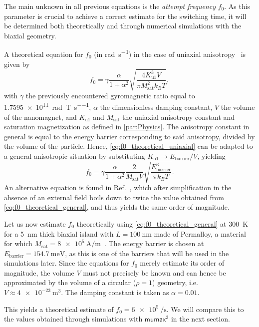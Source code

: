 \documentclass[11pt,a4paper,english,twoside]{article}
\newcommand{\mumax}{$\mathsf{mumax}^3$}
\begin{document}
The main unknown in all previous equations is the \textit{attempt frequency} $f_0$. As this parameter is crucial to achieve a correct estimate for the switching time, it will be determined both theoretically and through numerical simulations with the biaxial geometry. \par
A theoretical equation for $f_0$ (in \si{\radian\per\second}) in the case of uniaxial anisotropy~\cite{MuMax3, LEL-17b, f0_mumax3_reference} is given by
\begin{equation}
    f_0 = \gamma \frac{\alpha}{1+\alpha^2} \sqrt{\frac{4 K_\mathrm{u1}^3 V}{\pi M_\mathrm{sat}^2 k_B T}} \mathrm{,}
    \label{eq:f0_theoretical_uniaxial}
\end{equation}
with $\gamma$ the previously encountered gyromagnetic ratio equal to \SI{1.7595e11}{\radian\per\tesla\per\second}, $\alpha$ the dimensionless damping constant, $V$ the volume of the nanomagnet, and $K_\mathrm{u1}$ and $M_\mathrm{sat}$ the uniaxial anisotropy constant and saturation magnetization as defined in \cref{par:Physics}. The anisotropy constant in general is equal to the energy barrier corresponding to said anisotropy, divided by the volume of the particle. Hence, \cref{eq:f0_theoretical_uniaxial} can be adapted to a general anisotropic situation by substituting $K_\mathrm{u1} \rightarrow E_\mathrm{barrier}/V$, yielding
\begin{equation}
    f_0 = \gamma \frac{\alpha}{1+\alpha^2} \frac{2}{M_\mathrm{sat} V} \sqrt{\frac{E_\mathrm{barrier}^3}{\pi k_B T}} \mathrm{.}
    \label{eq:f0_theoretical_general}
\end{equation}
An alternative equation is found in Ref.~\cite{f0_alternative_Jonathan}, which after simplification in the absence of an external field boils down to twice the value obtained from \cref{eq:f0_theoretical_general}, and thus yields the same order of magnitude. \par
Let us now estimate $f_0$ theoretically using \cref{eq:f0_theoretical_general} at \SI{300}{\kelvin} for a \SI{5}{\nano\metre} thick biaxial island with $L=\SI{100}{\nano\metre}$ made of Permalloy, a material for which $M_\mathrm{sat}=\SI{8e5}{\ampere\per\metre}$~\cite{MuMax3}. The energy barrier is chosen at $E_\mathrm{barrier}=\SI{154.7}{\milli\electronvolt}$, as this is one of the barriers that will be used in the simulations later. Since the equations for $f_0$ merely estimate its order of magnitude, the volume $V$ must not precisely be known and can hence be approximated by the volume of a circular ($\rho=1$) geometry, i.e. $V\approx\SI{4e-23}{\metre\cubed}$. The damping constant is taken as $\alpha=0.01$. \par
This yields a theoretical estimate of $f_0 = \SI{6e5}{\per\second}$. We will compare this to the values obtained through simulations with \mumax{} in the next section.
\end{document}
